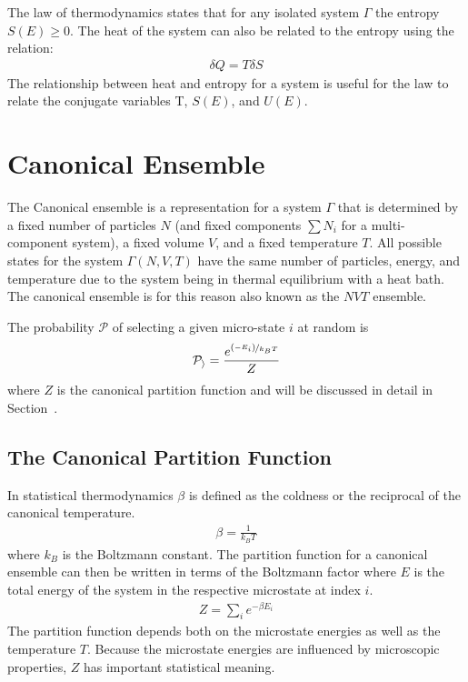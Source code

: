 The  law of thermodynamics states that for any isolated system $\Gamma$ the entropy $S(E) \geq 0$. The heat of the system can also be related to the entropy using the relation:
\begin{align}
    \delta Q = T\delta S
\end{align}
The relationship between heat and entropy for a system is useful for the  law to relate the conjugate variables T, $S(E)$, and $U(E)$.

\section{Canonical Ensemble}
The Canonical ensemble is a representation for a system $\Gamma$ that is
determined by a fixed number of particles $N$ (and fixed components $\sum N_i$
for a multi-component system), a fixed volume $V$, and a fixed temperature $T$.
All possible states for the system $\Gamma\left(N,V,T\right)$ have the same
number of particles, energy, and temperature due to the system being in thermal
equilibrium with a heat bath. The canonical ensemble is for this reason also
known as the $NVT$ ensemble.

The probability $\mathcal{P}$ of selecting a given micro-state $i$ at random is
\begin{align}
    \mathcal{P_i} = \frac{e^{\nicefrac{\left(-E_i\right)}{k_BT}}}{Z}
\end{align}
where $Z$ is the canonical partition function and will be discussed in detail in Section~.

\subsection{The Canonical Partition Function}\label{betaZ}
In statistical thermodynamics $\beta$ is defined as the coldness or the reciprocal of the canonical temperature.
\begin{align}
    \beta = \frac{1}{k_BT}
\end{align}
where $k_B$ is the Boltzmann constant. The partition function for a canonical ensemble can then be written in terms of the Boltzmann factor where $E$ is the total energy of the system in the respective microstate at index $i$.
\begin{align}
    Z = \sum_i e^{-\beta E_i}
\end{align}
The partition function depends both on the microstate energies as well as the
temperature $T$. Because the microstate energies are influenced by microscopic
properties, $Z$ has important statistical meaning.

